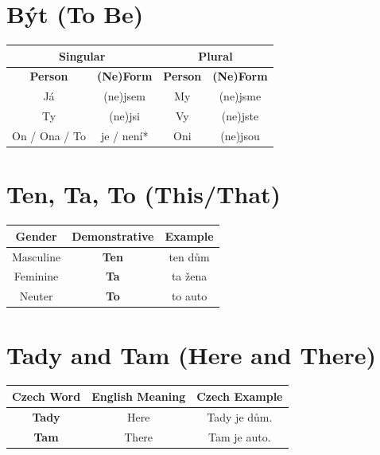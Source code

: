 \section{Být (To Be)}

\begin{center}
\begin{tabular}{cc|cc}
\hline
\multicolumn{2}{c}{\textbf{Singular}} & \multicolumn{2}{c}{\textbf{Plural}} \\ \hline
\textbf{Person} & \textbf{(Ne)Form} & \textbf{Person} & \textbf{(Ne)Form} \\ \hline
Já & (ne)jsem & My & (ne)jsme \\
Ty & (ne)jsi & Vy & (ne)jste \\ 
On / Ona / To & je / není* & Oni & (ne)jsou \\ \hline
\end{tabular}
\end{center}

\section{Ten, Ta, To (This/That)}

\begin{center}
\begin{tabular}{ccc}
\hline
\textbf{Gender} & \textbf{Demonstrative} & \textbf{Example} \\ \hline
Masculine & \textbf{Ten} & ten dům \\
Feminine & \textbf{Ta} & ta žena \\
Neuter & \textbf{To} & to auto \\ \hline
\end{tabular}
\end{center}

\section{Tady and Tam (Here and There)}

\begin{center}
\begin{tabular}{ccc}
\hline
\textbf{Czech Word} & \textbf{English Meaning} & \textbf{Czech Example} \\ \hline
\textbf{Tady} & Here & Tady je dům. \\
\textbf{Tam} & There & Tam je auto. \\ \hline
\end{tabular}
\end{center}

